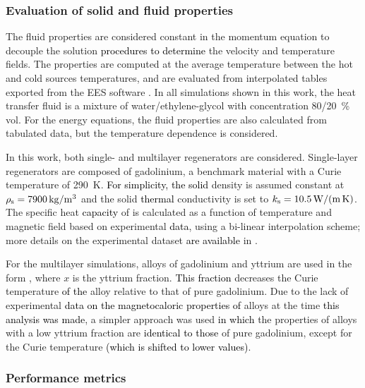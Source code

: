 \documentclass[referee]{svjour3}
\begin{document}
\subsubsection{Evaluation of solid and fluid properties}
\label{sec:eval-solid-fluid}

The fluid properties are considered constant in the momentum equation to decouple the solution \textcolor{black}{procedures to determine} the velocity and temperature fields. The properties are computed at the average temperature between the hot and cold sources temperatures, and are evaluated from interpolated tables exported from the EES software \cite{bib:klein13-ees}. In all simulations shown in this work, the heat transfer fluid is a mixture of water/ethylene-glycol with concentration \num{80}/\SI{20}{\percent} vol. For the energy equations, the fluid properties are also calculated from tabulated data, but the temperature dependence is considered.

In this work, both single- and multilayer regenerators are considered. Single-layer regenerators are composed of gadolinium,  a benchmark material with a Curie temperature of \SI{290}{\kelvin}. \textcolor{black}{For simplicity, the solid} density is assumed constant at $\rho\ped{s} = \SI{7900}{\kg\per\cubic\meter}$ and the solid \textcolor{black}{thermal} conductivity is set to $k_{\mathrm{s}} = \SI{10.5}{\watt\per\meter\per\kelvin}$. The specific heat \textcolor{black}{capacity} of  is calculated as a function of temperature and magnetic field based on experimental \textcolor{black}{data}, using a bi-linear interpolation scheme; more details on the experimental dataset \textcolor{black}{are available} in \cite{bib:trevizoli16_perfor_model}. 

For the multilayer simulations, alloys of gadolinium and yttrium are used in the form , where $x$ is the yttrium fraction.  \textcolor{black}{This fraction} decreases the Curie temperature  \textcolor{black}{of the} alloy relative to that of pure gadolinium. Due to the lack of experimental  \textcolor{black}{data on the magnetocaloric properties of}  alloys at the time \textcolor{black}{this analysis was made}, a simpler approach was used \textcolor{black}{in which} the properties of alloys with {a} low yttrium fraction are \textcolor{black}{identical to those} of pure gadolinium, except for the Curie temperature \textcolor{black}{(which is shifted to lower values)}. 


\subsubsection{Performance metrics}
\label{sec:performance-metrics}
\end{document}
